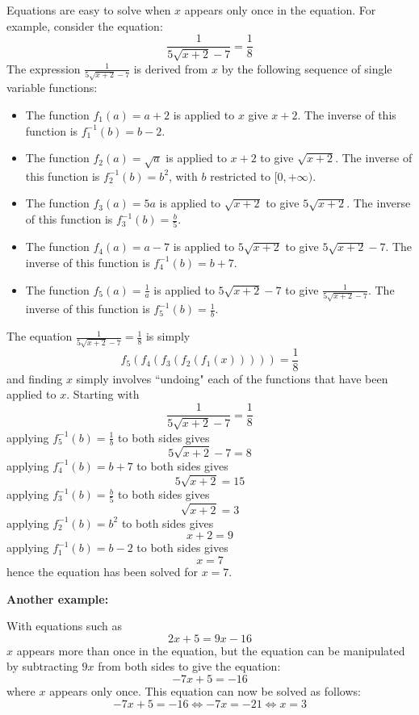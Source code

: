 \documentclass{article}
\begin{document}
Equations are easy to solve when \(x\) appears only once in the equation. For example, consider the equation:
\[\frac{1}{5\sqrt{x+2} - 7} = \frac{1}{8}\]
The expression \(\frac{1}{5\sqrt{x+2} - 7}\) is derived from \(x\) by the following sequence of single variable functions:
\begin{itemize}
\item The function \(f_1(a) = a + 2\) is applied to \(x\) give \(x + 2\). The inverse of this function is \(f_1^{-1}(b) = b - 2\).  
\item The function \(f_2(a) = \sqrt{a}\) is applied to \(x + 2\) to give \(\sqrt{x + 2}\). The inverse of this function is \(f_2^{-1}(b) = b^2\), with \(b\) restricted to \([0, +\infty)\).  
\item The function \(f_3(a) = 5a\) is applied to \(\sqrt{x + 2}\) to give \(5\sqrt{x + 2}\). The inverse of this function is \(f_3^{-1}(b) = \frac{b}{5}\). 
\item The function \(f_4(a) = a - 7\) is applied to \(5\sqrt{x + 2}\) to give \(5\sqrt{x + 2} - 7\). The inverse of this function is \(f_4^{-1}(b) = b + 7\). 
\item The function \(f_5(a) = \frac{1}{a}\) is applied to \(5\sqrt{x + 2} - 7\) to give \(\frac{1}{5\sqrt{x + 2} - 7}\). The inverse of this function is \(f_5^{-1}(b) = \frac{1}{b}\).
\end{itemize}
The equation \(\frac{1}{5\sqrt{x+2} - 7} = \frac{1}{8}\) is simply
\[f_5(f_4(f_3(f_2(f_1(x))))) = \frac{1}{8}\]
and finding \(x\) simply involves ``undoing" each of the functions that have been applied to \(x\). Starting with 
\[\frac{1}{5\sqrt{x+2} - 7} = \frac{1}{8}\]
applying \(f_5^{-1}(b) = \frac{1}{b}\) to both sides gives
\[5\sqrt{x+2} - 7 = 8\]
applying \(f_4^{-1}(b) = b + 7\) to both sides gives
\[5\sqrt{x+2} = 15\]
applying \(f_3^{-1}(b) = \frac{b}{5}\) to both sides gives
\[\sqrt{x+2} = 3\]
applying \(f_2^{-1}(b) = b^2\) to both sides gives
\[x + 2 = 9\]
applying \(f_1^{-1}(b) = b - 2\) to both sides gives
\[x = 7\]
hence the equation has been solved for \(x = 7\).

\vspace{5mm}

\textbf{Another example:}

With equations such as 
\[2x + 5 = 9x - 16\]
\(x\) appears more than once in the equation, but the equation can be manipulated by subtracting \(9x\) from both sides to give the equation:
\[-7x + 5 = -16\]
where \(x\) appears only once. This equation can now be solved as follows:
\[-7x + 5 = -16 \iff -7x = -21 \iff x = 3\]
\end{document}
